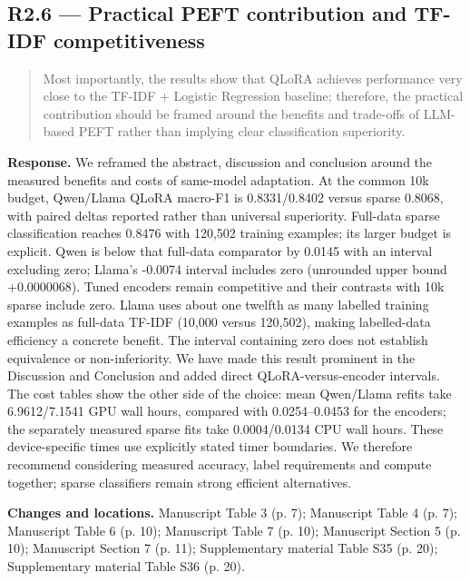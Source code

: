 \documentclass[11pt,a4paper]{article}
\begin{document}
\subsection*{R2.6 — Practical PEFT contribution and TF-IDF competitiveness}
\begin{quote}\small Most importantly, the results show that QLoRA achieves performance very close to the TF-IDF + Logistic Regression baseline; therefore, the practical contribution should be framed around the benefits and trade-offs of LLM-based PEFT rather than implying clear classification superiority.\end{quote}
\textbf{Response.} We reframed the abstract, discussion and conclusion around the measured benefits and costs of same-model adaptation. At the common 10k budget, Qwen/Llama QLoRA macro-F1 is 0.8331/0.8402 versus sparse 0.8068, with paired deltas reported rather than universal superiority. Full-data sparse classification reaches 0.8476 with 120,502 training examples; its larger budget is explicit. Qwen is below that full-data comparator by 0.0145 with an interval excluding zero; Llama's -0.0074 interval includes zero (unrounded upper bound +0.0000068). Tuned encoders remain competitive and their contrasts with 10k sparse include zero. Llama uses about one twelfth as many labelled training examples as full-data TF-IDF (10,000 versus 120,502), making labelled-data efficiency a concrete benefit. The interval containing zero does not establish equivalence or non-inferiority. We have made this result prominent in the Discussion and Conclusion and added direct QLoRA-versus-encoder intervals. The cost tables show the other side of the choice: mean Qwen/Llama refits take 6.9612/7.1541 GPU wall hours, compared with 0.0254--0.0453 for the encoders; the separately measured sparse fits take 0.0004/0.0134 CPU wall hours. These device-specific times use explicitly stated timer boundaries. We therefore recommend considering measured accuracy, label requirements and compute together; sparse classifiers remain strong efficient alternatives.

\textbf{Changes and locations.} Manuscript Table 3 (p. 7); Manuscript Table 4 (p. 7); Manuscript Table 6 (p. 10); Manuscript Table 7 (p. 10); Manuscript Section 5 (p. 10); Manuscript Section 7 (p. 11); Supplementary material Table S35 (p. 20); Supplementary material Table S36 (p. 20).
\end{document}
